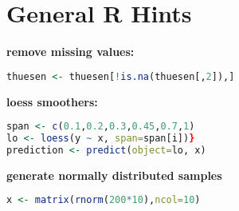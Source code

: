 \section{General R Hints}
\textbf{remove missing values: } \begin{lstlisting}[language = R]
thuesen <- thuesen[!is.na(thuesen[,2]),]
\end{lstlisting}
\textbf{loess smoothers: } \begin{lstlisting}[language = R]
span <- c(0.1,0.2,0.3,0.45,0.7,1)
lo <- loess(y ~ x, span=span[i])}
prediction <- predict(object=lo, x)
\end{lstlisting}
\textbf{generate normally distributed samples} 
\begin{lstlisting}[language=R]
x <- matrix(rnorm(200*10),ncol=10) \end{lstlisting}